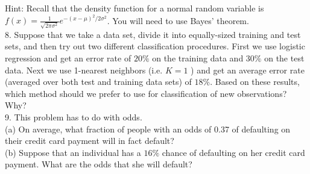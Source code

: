 \documentclass[10pt]{article}
\begin{document}
Hint: Recall that the density function for a normal random variable is $f(x)=\frac{1}{\sqrt{2 \pi \sigma^{2}}} e^{-(x-\mu)^{2} / 2 \sigma^{2}}$. You will need to use Bayes' theorem.\\
8. Suppose that we take a data set, divide it into equally-sized training and test sets, and then try out two different classification procedures. First we use logistic regression and get an error rate of $20 \%$ on the training data and $30 \%$ on the test data. Next we use 1-nearest neighbors (i.e. $K=1$ ) and get an average error rate (averaged over both test and training data sets) of $18 \%$. Based on these results, which method should we prefer to use for classification of new observations? Why?\\
9. This problem has to do with odds.\\
(a) On average, what fraction of people with an odds of 0.37 of defaulting on their credit card payment will in fact default?\\
(b) Suppose that an individual has a $16 \%$ chance of defaulting on her credit card payment. What are the odds that she will default?

\end{document}
